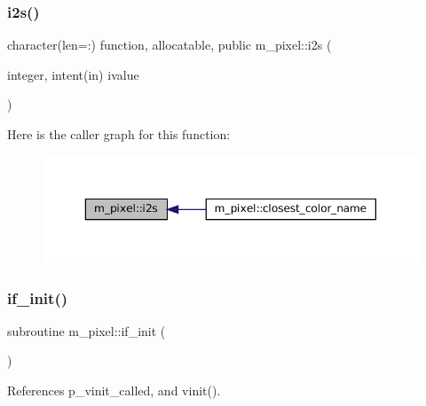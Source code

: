 \subsubsection{\texorpdfstring{i2s()}{i2s()}}
{\footnotesize\ttfamily character(len=\+:) function, allocatable, public m\+\_\+pixel\+::i2s (\begin{DoxyParamCaption}\item[{integer, intent(in)}]{ivalue }\end{DoxyParamCaption})}

Here is the caller graph for this function\+:
\nopagebreak
\begin{figure}[H]
\begin{center}
\leavevmode
\includegraphics[width=350pt]{namespacem__pixel_a4d23e0d3f4de5b3652a4eb5a61d7dc8d_icgraph}
\end{center}
\end{figure}
\mbox{\label{namespacem__pixel_a6c23c2779e54da4ac7505cfb816cc2b1}} 
\subsubsection{\texorpdfstring{if\+\_\+init()}{if\_init()}}
{\footnotesize\ttfamily subroutine m\+\_\+pixel\+::if\+\_\+init (\begin{DoxyParamCaption}{ }\end{DoxyParamCaption})\hspace{0.3cm}{\ttfamily [private]}}



References p\+\_\+vinit\+\_\+called, and vinit().

